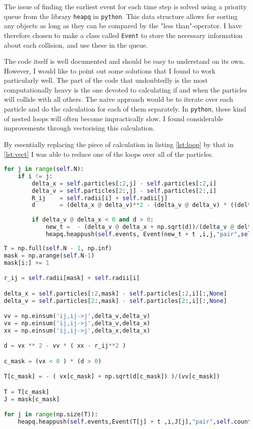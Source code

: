 The issue of finding the earliest event for each time step is solved using a priority queue from the library \texttt{heapq} in \texttt{python}. This data structure allows for sorting any objects as long as they can be compared by the "less than"-operator. I have therefore chosen to make a class called \texttt{Event} to store the necessary information about each collision, and use these in the queue.  

The code itself is well documented and should be easy to understand on its own. However, I would like to point out some solutions that I found to work particularly well. The part of the code that undoubtedly is the most computationally heavy is the one devoted to calculating if and when the particles will collide with all others. The naive approach would be to iterate over each particle and do the calculation for each of them separately. In \texttt{python}, these kind of nested loops will often become impractically slow. I found considerable improvements through vectorising this calculation. 

By essentially replacing the piece of calculation in listing \ref{lst:loop} by that in \ref{lst:vect} I was able to reduce one of the loops over all of the particles.

\begin{lstlisting}[language=Python,caption= Loop over all particles.,label={lst:loop}]
for j in range(self.N):
	if i != j:
		delta_x = self.particles[:2,j] - self.particles[:2,i]
		delta_v = self.particles[2:,j] - self.particles[2:,i]
		R_ij    = self.radii[i] + self.radii[j]
		d       = (delta_x @ delta_v)**2 - (delta_v @ delta_v) * ((delta_x @ delta_x) - R_ij**2)
		
		if delta_v @ delta_x < 0 and d > 0:
			new_t =  - (delta_v @ delta_x + np.sqrt(d))/(delta_v @ delta_v)
			heapq.heappush(self.events, Event(new_t + t ,i,j,"pair",self.count[i], self.count[j]))
\end{lstlisting}

\begin{lstlisting}[language=Python, caption= Vectorized calculation., label={lst:vect}]
T = np.full(self.N - 1, np.inf)
mask = np.arange(self.N-1)
mask[i:] += 1

r_ij = self.radii[mask] + self.radii[i]

delta_x = self.particles[:2,mask] - self.particles[:2,i][:,None]
delta_v = self.particles[2:,mask] - self.particles[2:,i][:,None]

vv = np.einsum('ij,ij->j',delta_v,delta_v)
vx = np.einsum('ij,ij->j',delta_v,delta_x)
xx = np.einsum('ij,ij->j',delta_x,delta_x)

d = vx ** 2 - vv * ( xx - r_ij**2 )

c_mask = (vx < 0 ) * (d > 0)

T[c_mask] = - ( vx[c_mask] + np.sqrt(d[c_mask]) )/(vv[c_mask])

T = T[c_mask]
J = mask[c_mask]

for j in range(np.size(T)):
	heapq.heappush(self.events,Event(T[j] + t ,i,J[j],"pair",self.count[i], self.count[J[j]]))
\end{lstlisting}

